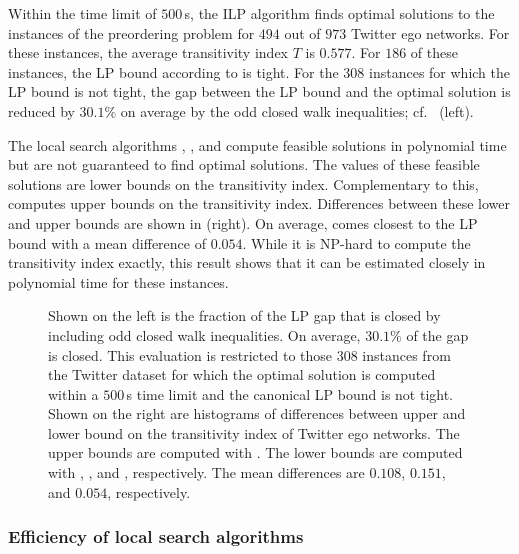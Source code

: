 Within the time limit of $500\,$s, the ILP algorithm finds optimal solutions to the instances of the preordering problem for $494$ out of $973$ Twitter ego networks.
For these instances, the average transitivity index $T$ is $0.577$.
For $186$ of these instances, the LP bound according to  is tight.
For the $308$ instances for which the LP bound is not tight, the gap between the LP bound and the optimal solution is reduced by $30.1\%$ on average by the odd closed walk inequalities; cf.~ (left).

The local search algorithms , , and  compute feasible solutions in polynomial time but are not guaranteed to find optimal solutions.
The values of these feasible solutions are lower bounds on the transitivity index.
Complementary to this,  computes upper bounds on the transitivity index.
Differences between these lower and upper bounds are shown in  (right).
On average,  comes closest to the LP bound with a mean difference of $0.054$.
While it is \textsc{NP}-hard to compute the transitivity index exactly, this result shows that it can be estimated closely in polynomial time for these instances.

\begin{figure}
\centering   

\hspace{5ex}

\caption{Shown on the left is the fraction of the LP gap that is closed by including odd closed walk inequalities.
On average, $30.1\%$ of the gap is closed.
This evaluation is restricted to those $308$ instances from the Twitter dataset for which the optimal solution is computed within a $500\,$s time limit and the canonical LP bound is not tight.
Shown on the right are histograms of differences between upper and lower bound on the transitivity index of Twitter ego networks.
The upper bounds are computed with . The lower bounds are computed with , , and , respectively.
The mean differences are $0.108$, $0.151$, and $0.054$, respectively.}
\label{fig:gap}
\end{figure}



\subsubsection{Efficiency of local search algorithms}

